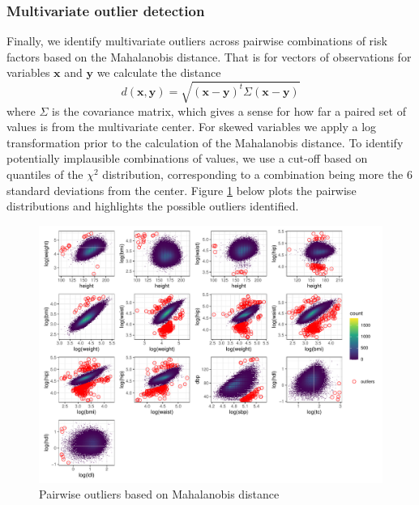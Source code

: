 \documentclass[12pt]{article}
\begin{document}
\begin{appendix}
\begin{refsection}
    \subsubsection{Multivariate outlier detection}
    Finally, we identify multivariate outliers across pairwise combinations of risk factors based on the Mahalanobis distance. That is for vectors of observations for variables $\mathbf{x}$ and $\mathbf{y}$ we calculate the distance
    $$d(\mathbf{x}, \mathbf{y}) = \sqrt{(\mathbf{x} - \mathbf{y})^t \Sigma (\mathbf{x} - \mathbf{y})}$$
    where $\Sigma$ is the covariance matrix, which gives a sense for how far a paired set of values is from the multivariate center. For skewed variables we apply a log transformation prior to the calculation of the Mahalanobis distance. To identify potentially implausible combinations of values, we use a cut-off based on quantiles of the $\chi^2$ distribution, corresponding to a combination being more the 6 standard deviations from the center. Figure \ref{fig:pairs} below plots the pairwise distributions and highlights the possible outliers identified. 

    \begin{figure}[H]
        \centering
        \includegraphics[width = \linewidth]{../3_figures/figS2_maha_outliers.pdf}
        \caption{Pairwise outliers based on Mahalanobis distance}
        \label{fig:pairs}
    \end{figure}


\end{refsection}
\end{appendix}
\end{document}
